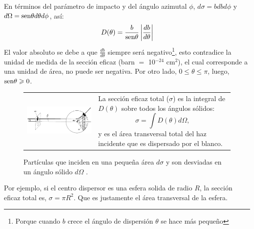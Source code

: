 En t\'erminos del par\'ametro de impacto y del \'angulo azimutal $\phi$, $d\sigma=bdbd\phi$ y
$d\Omega = \textup{sen}\theta d\theta d\phi$, as\'i:
\begin{equation}
D(\theta)=\frac{b}{\textup{sen} \theta}\left|\frac{db}{d\theta}\right|
\end{equation}
El valor absoluto se debe a que $\frac{db}{d\theta}$ siempre ser\'a negativo\footnote{Porque cuando $b$ crece el \'angulo de dispersi\'on $\theta$ se hace m\'as peque\~no}, esto contradice  la unidad de medida de la secci\'on eficaz (barn $=$ 10$^{-24}$ cm$^2$), el cual corresponde a una unidad de \'area, no puede ser negativa. Por otro lado, $0\leqslant\theta\leqslant\pi$, luego, $\textup{sen} \theta\geqslant 0$. 
\begin{figure}[H]
\begin{tabular}{p{9cm}p{5.45cm}}
\begin{minipage}[l]{9cm}
\includegraphics[width=9cm]{Imagenes/figurastesis/angulosolido}
\caption{Part\'iculas que inciden en una peque\~na \'area $d\sigma$ y son desviadas en un \'angulo s\'olido $d\Omega$ \cite{griphys}.}
\label{figura4}
\end{minipage}
&
\begin{minipage}[r]{5.45cm}
La secci\'on eficaz total ($\sigma$) es la integral de $D (\theta)$ sobre todos los \'angulos s\'olidos:
\begin{equation}
\sigma=\int D(\theta)d\Omega,
\end{equation}
y es el \'area transversal total del haz incidente que es dispersado por el blanco.
\end{minipage}
\end{tabular}
\end{figure}
 Por ejemplo, si el centro dispersor es una esfera solida de radio $R$, la secci\'on eficaz total es, $\sigma=\pi R^2$. Que es justamente el \'area transversal de la esfera.
